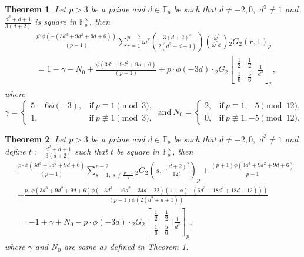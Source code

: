 \documentclass[12pt]{amsart}
\theoremstyle{plain}
\newtheorem{theorem}{Theorem}[section]
\theoremstyle{definition}
\theoremstyle{remark}
\numberwithin{equation}{section}
\begin{document}
\begin{theorem}\label{Hessian-trans}
	Let $p>3$ be a prime and  $d\in \mathbb{F}_p$ be such that $d\neq-2,0,$  $d^3\neq 1$ and $\frac{d^2+d+1}{3(d+2)}$ is square in $\mathbb{F}_p^\times$, then  
   \begin{align*}
&\frac{p^2\phi(-(3d^3+9d^2+9d+6))}{(p-1)} \sum_{r=1}^{p-2}{\omega}^r\left(\frac{3(d+2)^3}{2(d^2+d+1)}\right)  \binom{\overline{\omega}^r}{\overline{\omega}^r\phi}{_2G_2}(r,1)_p\\&=1-\gamma-N_0+\frac{\phi(3d^3+9d^2+9d+6)}{(p-1)} +p\cdot \phi(-3d)\cdot{_2G_2}\left[\begin{array}{cc}
  \frac{1}{2}   & \frac{1}{2}  \\
  \frac{1}{6}    & \frac{5}{6}  \end{array}|\frac{1}{d^3}\right]_p,
\end{align*}
where $$\gamma=\begin{cases}
    5-6\phi(-3), & \text{if} \ p \equiv 1 \pmod{3},\\
    1, & \text{if} \ p\not\equiv 1 \pmod{3},
\end{cases}\
\text{and} \ N_0=\begin{cases}
    2, & \text{if} \ p \equiv 1,-5 \pmod{12},\\0, &  \text{if}\ p\not\equiv 1,-5 \pmod{12}.
\end{cases}$$
\end{theorem}

\begin{theorem}\label{Hessian-trans2}
	Let $p>3$ be a prime and  $d\in \mathbb{F}_p$ be such that $d\neq-2,0,$ $d^3\neq 1$ and define $t:=\frac{d^2+d+1}{3(d+2)}$ such that $t$ be square in $\mathbb{F}_p^\times$, then  
  \begin{align*}
&\frac{p\cdot\phi(3d^3+9d^2+9d+6)}{(p-1)}\sum\limits_{s=1,\ s\neq\frac{p-1}{2}}^{p-2}\tilde{_2G_2}\left(s,\frac{(d+2)^2}{12t}\right)_p+\frac{(p+1)\phi(3d^3+9d^2+9d+6)}{p-1}\\&+\frac{p\cdot\phi(3d^3+9d^2+9d+6)\phi(-3d^3-16d^2-34d-22)(1+\phi(-(6d^3+18d^2+18d+12)))}{(p-1)\phi(2(d^2+d+1))}\\&=-1+\gamma +N_0 -p\cdot\phi(-3d)\cdot{_2G_2}\left[\begin{array}{cc}
  \frac{1}{2}   & \frac{1}{2}  \\
  \frac{1}{6}    & \frac{5}{6}  \end{array}|\frac{1}{d^3}\right]_p,
\end{align*}
where $\gamma$ and $N_0$ are same as defined in Theorem \ref{Hessian-trans}.
\end{theorem}
\end{document}
